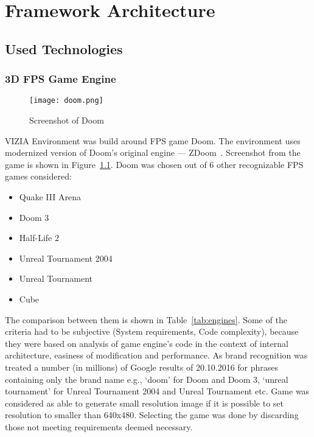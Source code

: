 
\chapter{Framework Architecture}
\label{ch:architecture}
\section{Used Technologies}
\label{sec:technologies}

\subsection{3D FPS Game Engine}



\begin{figure}
\centering
\texttt{[image: doom.png]}
\caption{Screenshot of Doom}
\label{fig:doom}
\end{figure}

VIZIA Environment was build around FPS game Doom. 
The environment uses  modernized version of Doom's original engine --- ZDoom~\cite{zdoom-main}. 
Screenshot from the game is shown in Figure~\ref{fig:doom}.
Doom was chosen out of 6 other recognizable FPS games considered: 

\begin{itemize}
\item Quake III Arena 
\item Doom 3
\item Half-Life 2 
\item Unreal Tournament 2004
\item Unreal Tournament
\item Cube
\end{itemize}
The comparison between them is shown in Table~\ref{tab:engines}.
Some of the criteria had to be subjective (System requirements, Code complexity), because they were based on analysis of game engine's code in the context of internal architecture, easiness of modification and performance. 
As brand recognition was treated a number (in millions) of Google results of 20.10.2016 for phrases containing only the brand name e.g., `doom' for Doom and Doom 3, `unreal tournament' for Unreal Tournament 2004 and Unreal Tournament etc.
Game was considered as able to generate small resolution image if it is possible to set resolution to smaller than 640x480.
Selecting the game was done by discarding those not meeting requirements deemed necessary.

